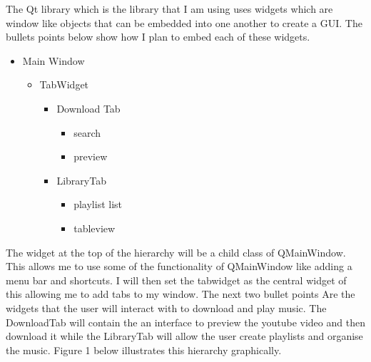 \documentclass{article}
\begin{document}
The Qt library which is the library that I am using uses widgets which are window
like objects that can be embedded into one another to create a GUI. The bullets
points below show how I plan to embed each of these widgets.

\begin{itemize}
    \item Main Window
        \begin{itemize}
            \item TabWidget
                \begin{itemize}
                    \item Download Tab
                        \begin{itemize}
                            \item search
                            \item preview
                        \end{itemize}
                    \item LibraryTab
                        \begin{itemize}
                            \item playlist list
                            \item tableview
                        \end{itemize}
                \end{itemize}
        \end{itemize}

\end{itemize}

The widget at the top of the hierarchy will be a child class of QMainWindow. This
allows me to use some of the functionality of QMainWindow like adding a menu bar
and shortcuts. I will then set the tabwidget as the central widget of this
allowing me to add tabs to my window. The next two bullet points Are the widgets
that the user will interact with to download and play music. The DownloadTab will
contain the an interface to preview the youtube video and then download it while
the LibraryTab will allow the user create playlists and organise the music. Figure 1
below illustrates this hierarchy graphically.
\end{document}

